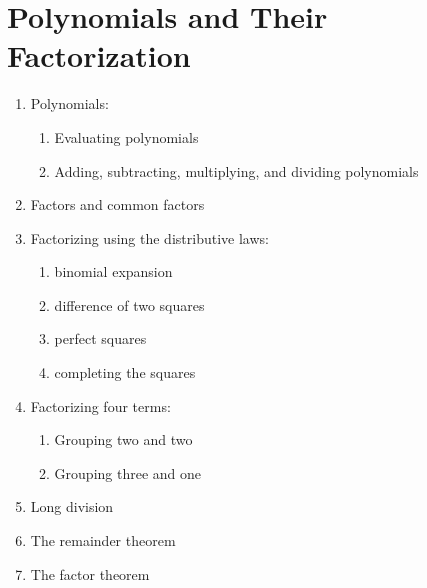 
\chapter{Polynomials and Their Factorization}

\begin{enumerate}
\item Polynomials:
  \begin{enumerate}
  \item Evaluating polynomials

  \item Adding, subtracting, multiplying, and dividing polynomials
  \end{enumerate}

\item Factors and common factors

\item Factorizing using the distributive laws:
  \begin{enumerate}
  \item binomial expansion

  \item difference of two squares

  \item perfect squares

  \item completing the squares
  \end{enumerate}

\item Factorizing four terms:
  \begin{enumerate}
  \item Grouping two and two

  \item Grouping three and one
  \end{enumerate}

\item Long division

\item The remainder theorem

\item The factor theorem
\end{enumerate}
